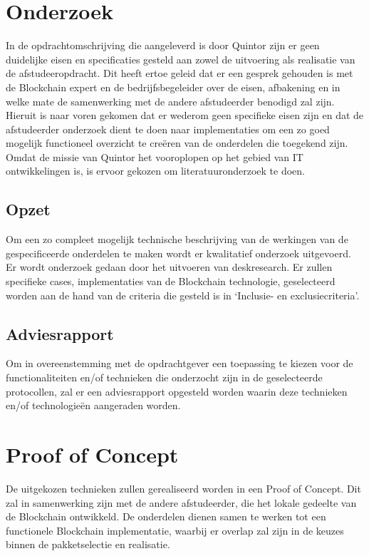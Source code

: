 \section{Onderzoek} In de opdrachtomschrijving die aangeleverd is door Quintor zijn er geen duidelijke eisen en specificaties gesteld aan zowel de uitvoering als realisatie van de afstudeeropdracht. Dit heeft ertoe geleid dat er een gesprek gehouden is met de Blockchain expert en de bedrijfsbegeleider over de eisen, afbakening en in welke mate de samenwerking met de andere afstudeerder benodigd zal zijn. Hieruit is naar voren gekomen dat er wederom geen specifieke eisen zijn en dat de afstudeerder onderzoek dient te doen naar implementaties om een zo goed mogelijk functioneel overzicht te creëren van de onderdelen die toegekend zijn. Omdat de missie van Quintor het vooroplopen op het gebied van IT ontwikkelingen is, is ervoor gekozen om literatuuronderzoek te doen.

\subsection{Opzet}

Om een zo compleet mogelijk technische beschrijving van de werkingen van de gespecificeerde onderdelen te maken wordt er kwalitatief onderzoek uitgevoerd. Er wordt onderzoek gedaan door het uitvoeren van deskresearch. Er zullen specifieke cases, implementaties van de Blockchain technologie, geselecteerd worden aan de hand van de criteria die gesteld is in ‘Inclusie- en exclusiecriteria’. 

\subsection{Adviesrapport}

Om in overeenstemming met de opdrachtgever een toepassing te kiezen voor de functionaliteiten en/of technieken die onderzocht zijn in de geselecteerde protocollen, zal er een adviesrapport opgesteld worden waarin deze technieken en/of technologieën aangeraden worden. 

\newpage
\section{Proof of Concept}
De uitgekozen technieken zullen gerealiseerd worden in een Proof of Concept. Dit zal in samenwerking zijn met de andere afstudeerder, die het lokale gedeelte van de Blockchain ontwikkeld. De onderdelen dienen samen te werken tot een functionele Blockchain implementatie, waarbij er overlap zal zijn in de keuzes binnen de pakketselectie en realisatie.

